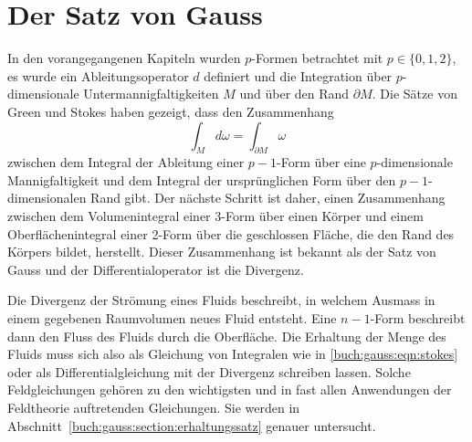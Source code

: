 %
%
%
\chapter{Der Satz von Gauss
\label{chapter:gauss}}

\noindent
In den vorangegangenen Kapiteln wurden $p$-Formen betrachtet mit
$p\in\{0,1,2\}$, es wurde ein Ableitungsoperator $d$ definiert
und die Integration über $p$-dimensionale Untermannigfaltigkeiten $M$
und über den Rand $\partial M$.
Die Sätze von Green und Stokes haben gezeigt, dass den Zusammenhang
\begin{equation}
\int_M d\omega = \int_{\partial M} \omega
\label{buch:gauss:eqn:stokes}
\end{equation}
zwischen dem Integral der Ableitung einer $p-1$-Form über eine
$p$-dimensionale Mannigfaltigkeit und dem Integral der ursprünglichen
Form über den $p-1$-dimensionalen Rand gibt.
Der nächste Schritt ist daher, einen Zusammenhang zwischen dem Volumenintegral
einer 3-Form über einen Körper und einem Oberflächenintegral
einer 2-Form über die geschlossen Fläche, die den Rand des Körpers bildet,
herstellt.
Dieser Zusammenhang ist bekannt als der Satz von Gauss und der
Differentialoperator ist die Divergenz.

Die Divergenz der Strömung eines Fluids beschreibt, in welchem Ausmass
in einem gegebenen Raumvolumen neues Fluid entsteht.
Eine $n-1$-Form beschreibt dann den Fluss des Fluids durch die Oberfläche.
Die Erhaltung der Menge des Fluids muss sich also als Gleichung
von Integralen wie in \eqref{buch:gauss:eqn:stokes} oder als
Differentialgleichung mit der Divergenz schreiben lassen.
Solche Feldgleichungen gehören zu den wichtigsten und in fast allen
Anwendungen der Feldtheorie auftretenden Gleichungen.
Sie werden in Abschnitt~\ref{buch:gauss:section:erhaltungssatz}
genauer untersucht.





